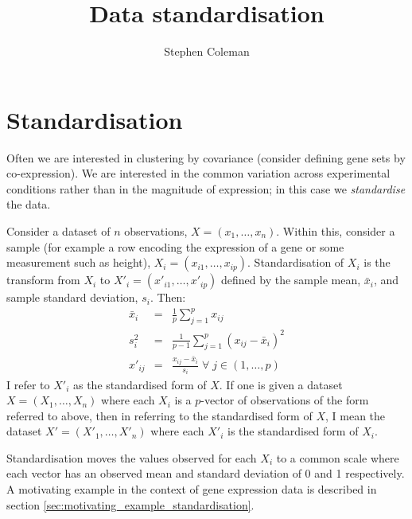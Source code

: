 \documentclass[14pt]{extarticle} %
\title{Data standardisation}
\author{Stephen Coleman}
\begin{document}
 
	\maketitle
	
	
	\section{Standardisation} \label{sec:standardisation}
	Often we are interested in clustering by covariance (consider defining gene sets by co-expression). We are interested in the common variation across experimental conditions rather than in the magnitude of expression; in this case we \emph{standardise} the data.
	
	Consider a dataset of $n$ observations, $X=(x_1,\ldots,x_n)$. Within this, consider a sample (for example a row encoding the expression of a gene or some measurement such as height), $X_i=(x_{i1},\ldots,x_{ip})$. Standardisation of $X_i$ is the transform from $X_i$ to $X'_i=(x'_{i1},\ldots,x'_{ip})$ defined by the sample mean, $\bar{x}_i$, and sample standard deviation, $s_i$. Then:
	\begin{eqnarray} \label{eqn:standardisation}
	\bar{x}_i &=& \frac{1}{p}\sum_{j=1}^p x_{ij} \\
	s_i^2 &=& \frac{1}{p - 1}\sum_{j=1}^p \left( x_{ij} - \bar{x}_i \right) ^2 \\
	x'_{ij} &=& \frac{x_{ij}- \bar{x}_i}{s_i} \; \forall \; j \in (1,\ldots,p)
	\end{eqnarray}
	I refer to $X'_i$ as the standardised form of $X$. If one is given a dataset $X=(X_1,\ldots,X_n)$ where each $X_i$ is a $p$-vector of observations of the form referred to above, then in referring to the standardised form of $X$, I mean the dataset $X'=(X'_1,\ldots,X'_n)$ where each $X'_i$ is the standardised form of $X_i$.
	
	Standardisation moves the values observed for each $X_i$ to a common scale where each vector has an observed mean and standard deviation of 0 and 1 respectively. A motivating example in the context of gene expression data is described in section \ref{sec:motivating_example_standardisation}.
	
\end{document}

